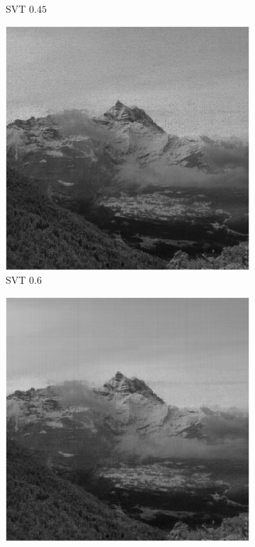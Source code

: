 \begin{figure}[!ht]
\begin{subfigure}{0.325\linewidth}
        \caption{SVT $0.45$}
    \end{subfigure}
    \hfill
    \begin{subfigure}{0.325\linewidth}
        \includegraphics[width=\linewidth]{Poglavja/Slike/grayscale1000/slikaRez60SVT.png}
        \caption{SVT $0.6$}
    \end{subfigure}
    \begin{subfigure}{0.325\linewidth}
        \includegraphics[width=\linewidth]{Poglavja/Slike/grayscale1000/slikaRez35TNNM.png}

\end{subfigure}
\end{figure}
